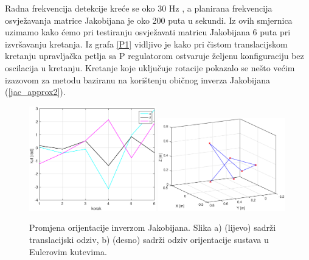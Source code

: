 \documentclass[times, utf8, diplomski, numeric]{fer}
\begin{document}
Radna frekvencija detekcije kreće se oko 30 Hz , a planirana frekvencija osvježavanja matrice Jakobijana je oko 200 puta u sekundi.
Iz ovih smjernica uzimamo kako ćemo pri testiranju osvježavati matricu Jakobijana 6 puta pri izvršavanju kretanja.
Iz grafa \ref{P1} vidljivo je kako pri čistom translacijskom kretanju upravljačka petlja sa P regulatorom ostvaruje željenu konfiguraciju  bez oscilacija u kretanju.
Kretanje koje uključuje rotacije pokazalo se nešto većim izazovom za metodu baziranu na korištenju običnog inverza Jakobijana (\ref{jac_approx2}).
\begin{figure}[h!]
\centering
\includegraphics[width = 0.49\textwidth]{matlab_rot1}
\includegraphics[width = 0.49\textwidth]{matlab_rot1_xyz}
\caption{Promjena orijentacije inverzom Jakobijana.
Slika a) (lijevo) sadrži translacijski odziv, b) (desno) sadrži odziv orijentacije sustava u Eulerovim kutevima.} \label{rot1m}
\end{figure}
\end{document}
